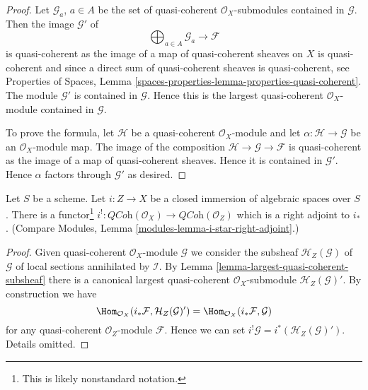 \begin{proof}
Let $\mathcal{G}_a$, $a \in A$ be the set of quasi-coherent
$\mathcal{O}_X$-submodules contained in $\mathcal{G}$.
Then the image $\mathcal{G}'$ of
$$
\bigoplus\nolimits_{a \in A} \mathcal{G}_a \longrightarrow \mathcal{F}
$$
is quasi-coherent as the image of a map of quasi-coherent sheaves
on $X$ is quasi-coherent and since a direct sum of quasi-coherent sheaves
is quasi-coherent, see
Properties of Spaces,
Lemma \ref{spaces-properties-lemma-properties-quasi-coherent}.
The module $\mathcal{G}'$ is contained in $\mathcal{G}$. Hence this is the
largest quasi-coherent $\mathcal{O}_X$-module contained in $\mathcal{G}$.

\medskip\noindent
To prove the formula, let $\mathcal{H}$ be a quasi-coherent
$\mathcal{O}_X$-module and let $\alpha : \mathcal{H} \to \mathcal{G}$
be an $\mathcal{O}_X$-module map. The image of the composition
$\mathcal{H} \to \mathcal{G} \to \mathcal{F}$ is quasi-coherent
as the image of a map of quasi-coherent sheaves. Hence it is contained
in $\mathcal{G}'$. Hence $\alpha$ factors through $\mathcal{G}'$
as desired.
\end{proof}

\begin{lemma}
\label{lemma-i-upper-shriek}
Let $S$ be a scheme.
Let $i : Z \to X$ be a closed immersion of algebraic spaces over $S$.
There is a functor\footnote{This is likely nonstandard notation.}
$i^! : \textit{QCoh}(\mathcal{O}_X) \to \textit{QCoh}(\mathcal{O}_Z)$
which is a right adjoint to $i_*$. (Compare
Modules, Lemma \ref{modules-lemma-i-star-right-adjoint}.)
\end{lemma}

\begin{proof}
Given quasi-coherent $\mathcal{O}_X$-module $\mathcal{G}$ we consider
the subsheaf $\mathcal{H}_Z(\mathcal{G})$ of $\mathcal{G}$ of local sections
annihilated by $\mathcal{I}$. By
Lemma \ref{lemma-largest-quasi-coherent-subsheaf}
there is a canonical largest quasi-coherent $\mathcal{O}_X$-submodule
$\mathcal{H}_Z(\mathcal{G})'$. By construction we have
$$
\Hom_{\mathcal{O}_X}(i_*\mathcal{F}, \mathcal{H}_Z(\mathcal{G})')
=
\Hom_{\mathcal{O}_X}(i_*\mathcal{F}, \mathcal{G})
$$
for any quasi-coherent $\mathcal{O}_Z$-module $\mathcal{F}$.
Hence we can set $i^!\mathcal{G} = i^*(\mathcal{H}_Z(\mathcal{G})')$.
Details omitted.
\end{proof}








